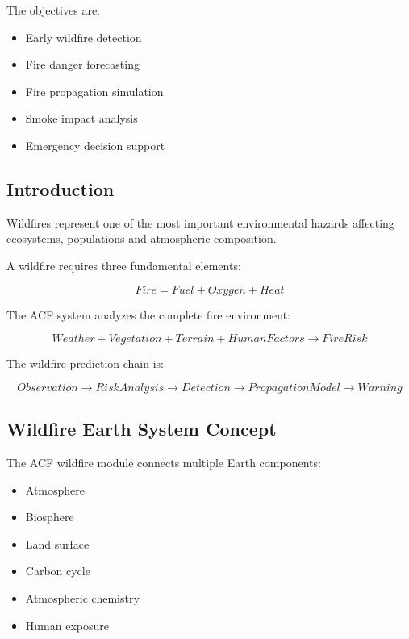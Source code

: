 The objectives are:

\begin{itemize}

\item Early wildfire detection

\item Fire danger forecasting

\item Fire propagation simulation

\item Smoke impact analysis

\item Emergency decision support

\end{itemize}



\subsection{Introduction}

Wildfires represent one of the most important environmental hazards
affecting ecosystems, populations and atmospheric composition.

A wildfire requires three fundamental elements:

\[
Fire =
Fuel
+
Oxygen
+
Heat
\]


The ACF system analyzes the complete fire environment:

\[
Weather
+
Vegetation
+
Terrain
+
HumanFactors
\rightarrow
FireRisk
\]


The wildfire prediction chain is:

\[
Observation
\rightarrow
RiskAnalysis
\rightarrow
Detection
\rightarrow
PropagationModel
\rightarrow
Warning
\]



\subsection{Wildfire Earth System Concept}

The ACF wildfire module connects multiple Earth components:

\begin{itemize}

\item Atmosphere

\item Biosphere

\item Land surface

\item Carbon cycle

\item Atmospheric chemistry

\item Human exposure

\end{itemize}


